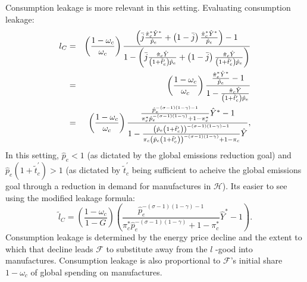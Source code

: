 \documentclass[notitlepage,12pt]{article}
\begin{document}
Consumption leakage is more relevant in this setting. Evaluating consumption
leakage:%
\begin{eqnarray*}
l_{C} &=&\left( \frac{1-\omega _{c}}{\omega _{c}}\right) \frac{\left( \bar{j}%
\frac{\hat{\pi}_{c}^{\ast }\hat{Y}^{\ast }}{\hat{p}_{e}}+\left( 1-\bar{j}%
\right) \frac{\hat{\pi}_{c}^{\ast }\hat{Y}^{\ast }}{\hat{p}_{e}}\right) -1}{%
1-\left( \bar{j}\frac{\hat{\pi}_{c}\hat{Y}}{\left( 1+\tilde{t}_{c}^{\prime
}\right) \hat{p}_{e}}+\left( 1-\bar{j}\right) \frac{\hat{\pi}_{c}\hat{Y}}{%
\left( 1+\tilde{t}_{c}^{\prime }\right) \hat{p}_{e}}\right) } \\
&=&\left( \frac{1-\omega _{c}}{\omega _{c}}\right) \frac{\frac{\hat{\pi}%
_{c}^{\ast }\hat{Y}^{\ast }}{\hat{p}_{e}}-1}{1-\frac{\hat{\pi}_{c}\hat{Y}}{%
\left( 1+\tilde{t}_{c}^{\prime }\right) \hat{p}_{e}}} \\
&=&\left( \frac{1-\omega _{c}}{\omega _{c}}\right) \frac{\frac{\hat{p}%
_{e}^{-\left( \sigma -1\right) \left( 1-\gamma \right) -1}}{\pi _{c}^{\ast }%
\hat{p}_{e}^{-\left( \sigma -1\right) \left( 1-\gamma \right) }+1-\pi
_{c}^{\ast }}\hat{Y}^{\ast }-1}{1-\frac{\left( \hat{p}_{e}\left( 1+\tilde{t}%
_{c}^{\prime }\right) \right) ^{-\left( \sigma -1\right) \left( 1-\gamma
\right) -1}}{\pi _{c}\left( \hat{p}_{e}\left( 1+\tilde{t}_{c}^{\prime
}\right) \right) ^{-\left( \sigma -1\right) \left( 1-\gamma \right) }+1-\pi
_{c}}\hat{Y}},
\end{eqnarray*}%
In this setting, $\hat{p}_{e}<1$ (as dictated by the global emissions
reduction goal) and $\hat{p}_{e}\left( 1+\tilde{t}_{c}^{\prime }\right) >1$
(as dictated by $\tilde{t}_{c}^{\prime }$ being sufficient to acheive the
global emissions goal through a reduction in demand for manufactures in $%
\mathcal{H}$). Its easier to see using the modified leakage formula:%
\begin{equation*}
\tilde{l}_{C}=\left( \frac{1-\omega _{c}}{1-G}\right) \left( \frac{\hat{p}%
_{e}^{-\left( \sigma -1\right) \left( 1-\gamma \right) -1}}{\pi _{c}^{\ast }%
\hat{p}_{e}^{-\left( \sigma -1\right) \left( 1-\gamma \right) }+1-\pi
_{c}^{\ast }}\hat{Y}^{\ast }-1\right) .
\end{equation*}%
Consumption leakage is determined by the energy price decline and the extent
to which that decline leads $\mathcal{F}$ to substitute away from the $l$%
-good into manufactures. Consumption leakage is also proportional to $%
\mathcal{F}$'s initial share $1-\omega _{c}$ of global spending on
manufactures. 
\end{document}
